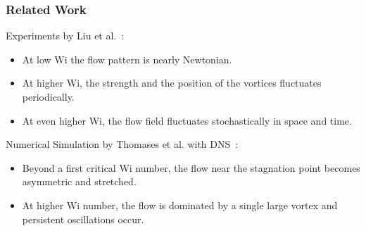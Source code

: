 \begin{frame}
  \frametitle{Related Work}
  \begin{block}{Experiments by Liu et al.~\footnotemark[2]:}
    \begin{itemize}
    \item  At low Wi the flow pattern is nearly Newtonian. 
    \item At higher Wi, the strength and the position of the vortices fluctuates periodically.
    \item At even higher Wi, the flow field fluctuates stochastically in space and time.
    \end{itemize}
  \end{block}
  \begin{block}{Numerical Simulation by Thomases et al. with DNS~\footnotemark: }
    \begin{itemize}
    \item Beyond a first critical Wi number, the flow near the stagnation point becomes asymmetric and stretched.
    \item At higher Wi number, the flow is dominated by a single large vortex and persistent oscillations occur. 
    \end{itemize}
  \end{block}
\end{frame}



